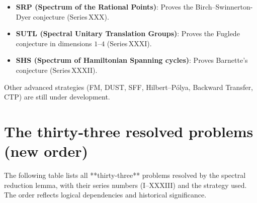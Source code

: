 \documentclass[11pt,a4paper]{article}
\begin{document}
\begin{itemize}
\item \textbf{SRP (Spectrum of the Rational Points)}: Proves the Birch–Swinnerton-Dyer conjecture (Series XXX).
\item \textbf{SUTL (Spectral Unitary Translation Groups)}: Proves the Fuglede conjecture in dimensions \(1\)–\(4\) (Series XXXI).
\item \textbf{SHS (Spectrum of Hamiltonian Spanning cycles)}: Proves Barnette's conjecture (Series XXXII).
\end{itemize}

Other advanced strategies (FM, DUST, SFF, Hilbert–Pólya, Backward Transfer, CTP) are still under development.

\section{The thirty‑three resolved problems (new order)}

The following table lists all **thirty‑three** problems resolved by the spectral reduction lemma, with their series numbers (I–XXXIII) and the strategy used. The order reflects logical dependencies and historical significance.
\end{document}
